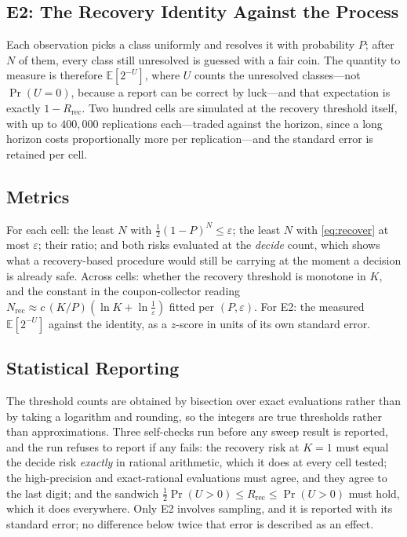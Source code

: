 \subsection{E2: The Recovery Identity Against the Process}
\label{sec:e2}

Each observation picks a class uniformly and resolves it with probability $P$; after $N$ of
them, every class still unresolved is guessed with a fair coin. The quantity to measure is
therefore $\mathbb{E}[2^{-U}]$, where $U$ counts the unresolved classes---not
$\Pr(U=0)$, because a report can be correct by luck---and that expectation is exactly
$1-R_{\mathrm{rec}}$. Two hundred cells are simulated at the recovery threshold itself, with up to
$400{,}000$ replications each---traded against the horizon, since a long horizon costs
proportionally more per replication---and the standard error is retained per cell.

\subsection{Metrics}

For each cell: the least $N$ with $\tfrac12(1-P)^{N}\le\varepsilon$; the least $N$ with
\eqref{eq:recover} at most $\varepsilon$; their ratio; and both risks evaluated at the
\emph{decide} count, which shows what a recovery-based procedure would still be carrying at
the moment a decision is already safe. Across cells: whether the recovery threshold is
monotone in $K$, and the constant in the coupon-collector reading
$N_{\mathrm{rec}}\approx c\,(K/P)(\ln K+\ln\tfrac1\varepsilon)$ fitted per $(P,\varepsilon)$.
For E2: the measured $\mathbb{E}[2^{-U}]$ against the identity, as a $z$-score in units of its
own standard error.

\subsection{Statistical Reporting}

The threshold counts are obtained by bisection over exact evaluations rather than by taking a
logarithm and rounding, so the integers are true thresholds rather than approximations. Three
self-checks run before any sweep result is reported, and the run refuses to report if any
fails: the recovery risk at $K=1$ must equal the decide risk \emph{exactly} in rational
arithmetic, which it does at every cell tested; the high-precision and exact-rational
evaluations must agree, and they agree to the last digit; and the sandwich
$\tfrac12\Pr(U>0)\le R_{\mathrm{rec}}\le\Pr(U>0)$ must hold, which it does everywhere. Only
E2 involves sampling, and it is reported with its standard error; no difference below twice
that error is described as an effect.

